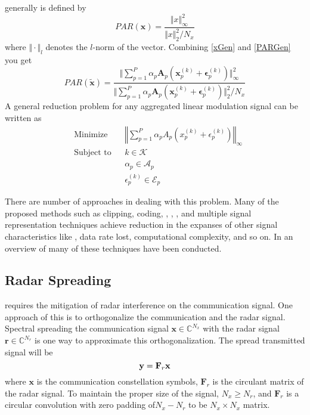 \PAR generally is defined by
\begin{equation}
PAR(\mathbf{x})=\frac{\Vert x \Vert^2_\infty}{\Vert x \Vert^2_2/N_x}
\label{PARGen}
\end{equation}
where $\Vert\cdot\Vert_l$ denotes the $l$-norm of the vector.  Combining \eqref{xGen} and \eqref{PARGen} you get
\begin{equation}
PAR(\mathbf{\tilde{x}})=\frac{\Vert \sum_{p=1}^P\alpha_p\mathbf{A}_p\left(\mathbf{x}_p^{(k)}+\mathbf{\epsilon}_p^{(k)}\right) \Vert^2_\infty}{\Vert \sum_{p=1}^P\alpha_p\mathbf{A}_p\left(\mathbf{x}_p^{(k)}+\mathbf{\epsilon}_p^{(k)}\right) \Vert^2_2/N_x}
\end{equation}
A general \PAR reduction problem for any aggregated linear modulation signal can be written as
\begin{equation}
     \begin{aligned}
      &\text{Minimize } & &\left\Vert\sum_{p=1}^P\alpha_pA_p\left(x_p^{(k)}+\epsilon_p^{(k)}\right)\right\Vert_\infty  \\
      &\text{Subject to} &  &k\in \mathcal{K} \\
      & & &\alpha_p\in\mathcal{A}_p\\
      & & &\epsilon_p^{(k)}\in\mathcal{E}_p 
     \end{aligned}
\end{equation}

There are number of approaches in dealing with this \PAR problem.  Many of the proposed methods such as clipping, coding, \TR, \TI, \ACE, and multiple signal representation techniques achieve \PAR reduction in the expanses of other signal characteristics like \BER, data rate lost, computational complexity, and so on.  In \cite{seung05} an overview of many of these techniques have been conducted.

\subsection{Radar Spreading}
\SSPARC requires the mitigation of radar interference on the communication signal. One approach of this is to orthogonalize the communication and the radar signal.  Spectral spreading the communication signal ${\mathbf{x}\in \mathbb{C}^{N_x}}$ with the radar signal $\mathbf{r}\in \mathbb{C}^{N_r}$ is one way to approximate this orthogonalization.  The spread transmitted signal will be
\begin{equation}
\mathbf{y}=\mathbf{F}_r \mathbf{x}\\
\label{eq1}
\end{equation}  
where $\mathbf{x}$ is the communication constellation symbols, $\mathbf{F}_r$ is the circulant matrix of the radar signal.  To maintain the proper size of the signal, $N_x\geq N_r$, and $\mathbf{F}_r$ is a circular convolution with zero padding of$N_x-N_r$ to be $N_x\times N_x$ matrix.

